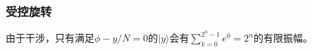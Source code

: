 \documentclass{article}
\begin{document}
\subsubsection{受控旋转}

由于干涉，只有满足$\phi - y/N=0$的$|y\rangle$会有$\sum_{k=0}^{2^{n}-1} e^{0}=2^{n}$的有限振幅。
\end{document}
